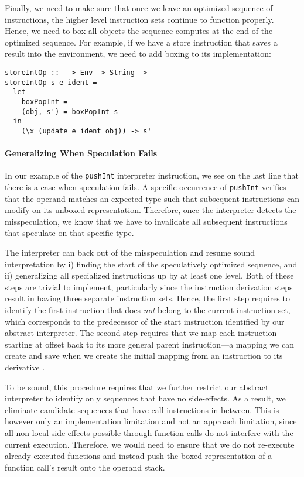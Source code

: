 \documentclass[preprint,10pt]{popl14conf}
\begin{document}
Finally, we need to make sure that once we leave an optimized sequence of instructions, the higher
level instruction sets continue to function properly.
Hence, we need to box all objects the sequence computes at the end of the optimized sequence.
For example, if we have a store instruction that saves a result into the environment, we need to
add boxing to its implementation:
\begin{lstlisting}[style=prettyhaskell]
storeIntOp ::  -> Env -> String -> 
storeIntOp s e ident =
  let
    boxPopInt = 
    (obj, s') = boxPopInt s
  in
    (\x (update e ident obj)) -> s'
\end{lstlisting}


\paragraph{Generalizing When Speculation Fails}
In our example of the \texttt{pushInt} interpreter instruction, we see on the last line that there
is a case when speculation fails.
A specific occurrence of \texttt{pushInt} verifies that the operand matches an expected type such
that subsequent instructions can modify on its unboxed representation.
Therefore, once the interpreter detects the misspeculation, we know that we have to invalidate all
subsequent instructions that speculate on that specific type.

The interpreter can back out of the misspeculation and resume sound interpretation by i) finding the
start of the speculatively optimized sequence, and ii) generalizing all specialized instructions up
by at least one level.
Both of these steps are trivial to implement, particularly since the instruction derivation
steps result in having three separate instruction sets.
Hence, the first step requires to identify the first instruction  that does \emph{not} belong
to the current instruction set, which corresponds to the predecessor of the start instruction 
identified by our abstract interpreter.
The second step requires that we map each instruction starting at offset  back to its more
general parent instruction---a mapping we can create and save when we create the initial mapping
from an instruction  to its derivative .

To be sound, this procedure requires that we further restrict our abstract interpreter to identify
only sequences that have no side-effects.
As a result, we eliminate candidate sequences that have call instructions in between.
This is however only an implementation limitation and not an approach limitation, since all
non-local side-effects possible through function calls do not interfere with the current execution.
Therefore, we would need to ensure that we do not re-execute already executed functions and instead
push the boxed representation of a function call's result onto the operand stack.
\end{document}
